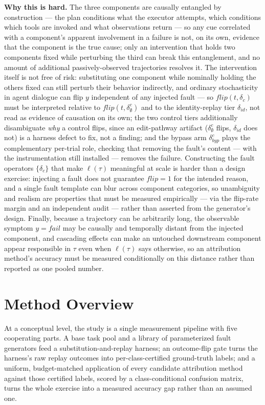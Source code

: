 \documentclass[11pt]{article}
\begin{document}
\noindent\textbf{Why this is hard.} The three components are causally entangled by construction --- the plan conditions what the executor attempts, which conditions which tools are invoked and what observations return --- so any cue correlated with a component's apparent involvement in a failure is not, on its own, evidence that the component is the true cause; only an intervention that holds two components fixed while perturbing the third can break this entanglement, and no amount of additional passively-observed trajectories resolves it. The intervention itself is not free of risk: substituting one component while nominally holding the others fixed can still perturb their behavior indirectly, and ordinary stochasticity in agent dialogue can flip $y$ independent of any injected fault --- so $flip(t, \delta_c)$ must be interpreted relative to $flip(t, \delta_\emptyset^c)$ and to the identity-replay tier $\delta_{id}$, not read as evidence of causation on its own; the two control tiers additionally disambiguate \emph{why} a control flips, since an edit-pathway artifact ($\delta_\emptyset^c$ flips, $\delta_{id}$ does not) is a harness defect to fix, not a finding; and the bypass arm $\delta_{byp}^c$ plays the complementary per-trial role, checking that removing the fault's content --- with the instrumentation still installed --- removes the failure. Constructing the fault operators $\{\delta_c\}$ that make $\ell(\tau)$ meaningful at scale is harder than a design exercise: injecting a fault does not guarantee $flip = 1$ for the intended reason, and a single fault template can blur across component categories, so unambiguity and realism are properties that must be measured empirically --- via the flip-rate margin and an independent audit --- rather than asserted from the generator's design. Finally, because a trajectory can be arbitrarily long, the observable symptom $y = fail$ may be causally and temporally distant from the injected component, and cascading effects can make an untouched downstream component appear responsible in $\tau$ even when $\ell(\tau)$ says otherwise, so an attribution method's accuracy must be measured conditionally on this distance rather than reported as one pooled number.

\section{Method Overview}

At a conceptual level, the study is a single measurement pipeline with five cooperating parts. A base task pool and a library of parameterized fault generators feed a substitution-and-replay harness; an outcome-flip gate turns the harness's raw replay outcomes into per-class-certified ground-truth labels; and a uniform, budget-matched application of every candidate attribution method against those certified labels, scored by a class-conditional confusion matrix, turns the whole exercise into a measured accuracy gap rather than an assumed one.
\end{document}
